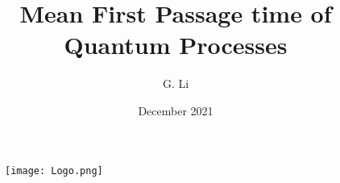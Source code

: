 \documentclass{article}
\title{Mean First Passage time of Quantum Processes}
\author{G. Li}
\date{December 2021}
\numberwithin{equation}{section}
\newcommand{\1}{\mathbb{1}}
\begin{document}
\begin{figure}
    \centering
    \texttt{[image: Logo.png]}
\end{figure}
\maketitle
\newpage
\tableofcontents
\newpage
\end{document}

